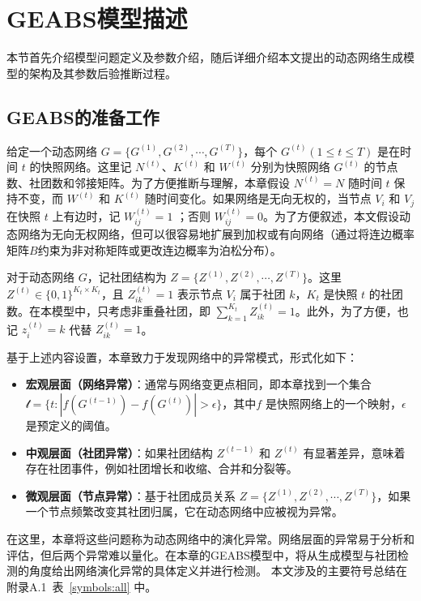 \section{GEABS模型描述\label{chap4:model}}

\label{sec:method}
本节首先介绍模型问题定义及参数介绍，随后详细介绍本文提出的动态网络生成模型的架构及其参数后验推断过程。


\subsection{GEABS的准备工作}
给定一个动态网络 $G =\{ G^{(1)}, G^{(2)}, \cdots, G^{(T)} \}$，每个 $G^{(t)} (1 \le t \le T)$ 是在时间 $t$ 的快照网络。这里记 $N^{(t)}$、$K^{(t)}$ 和 $W^{(t)}$ 分别为快照网络 $G^{(t)}$ 的节点数、社团数和邻接矩阵。为了方便推断与理解，本章假设 $N^{(t)} = N$ 随时间 $t$ 保持不变，而 $W^{(t)}$ 和 $K^{(t)}$ 随时间变化。如果网络是无向无权的，当节点 $V_i$ 和 $V_j$ 在快照 $t$ 上有边时，记 $W^{(t)}_{ij} = 1$ ；否则 $W^{(t)}_{ij} = 0$。为了方便叙述，本文假设动态网络为无向无权网络，但可以很容易地扩展到加权或有向网络（通过将连边概率矩阵$B$约束为非对称矩阵或更改连边概率为泊松分布）。

对于动态网络 $G$，记社团结构为 $Z = \{ Z^{(1)}, Z^{(2)}, \cdots, Z^{(T)} \}$。这里 $Z^{(t)} \in \{0, 1 \}^{K_t \times K_t}$，且 $Z^{(t)}_{ik} = 1$ 表示节点 $V_i$ 属于社团 $k$，$K_t$ 是快照 $t$ 的社团数。在本模型中，只考虑非重叠社团，即 $\sum_{k=1}^{K_t} Z^{(t)}_{ik} = 1$。此外，为了方便，也记 $z^{(t)}_{i} = k$ 代替 $Z^{(t)}_{ik} = 1$。



基于上述内容设置，本章致力于发现网络中的异常模式，形式化如下：
\begin{itemize}
    \item \textbf{宏观层面（网络异常）}：通常与网络变更点相同，即本章找到一个集合 $\mathcal{t} = \{t : |f(G^{(t-1)}) -f(G^{(t)})| > \epsilon  \} $，其中$f$ 是快照网络上的一个映射，$\epsilon$是预定义的阈值。
    \item \textbf{中观层面（社团异常）}：如果社团结构 $Z^{(t-1)}$ 和 $Z^{(t)}$ 有显著差异，意味着存在社团事件，例如社团增长和收缩、合并和分裂等。
    \item \textbf{微观层面（节点异常）}：基于社团成员关系 $Z = \{ Z^{(1)}, Z^{(2)}, \cdots, Z^{(T)} \}$，如果一个节点频繁改变其社团归属，它在动态网络中应被视为异常。
\end{itemize}

在这里，本章将这些问题称为动态网络中的演化异常。网络层面的异常易于分析和评估，但后两个异常难以量化。在本章的GEABS模型中，将从生成模型与社团检测的角度给出网络演化异常的具体定义并进行检测。
本文涉及的主要符号总结在附录A.1~表~\ref{symbols:all} 中。

